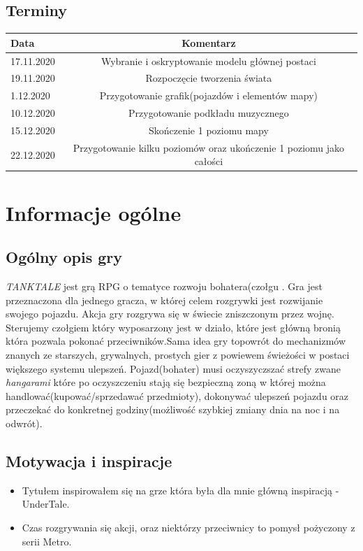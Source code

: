 \documentclass{article}
\begin{document}
   \subsection{Terminy}
\begin{tabular}{|l|c|}
	\hline
	Data  & Komentarz\\
	\hline
	17.11.2020  & Wybranie i oskryptowanie modelu głównej postaci\\
	\hline
	19.11.2020  & Rozpoczęcie tworzenia świata\\
	\hline
	1.12.2020  & Przygotowanie grafik(pojazdów i elementów mapy)\\
	\hline
	10.12.2020  & Przygotowanie podkładu muzycznego\\
	\hline
	15.12.2020  & Skończenie 1 poziomu mapy\\
		\hline
	22.12.2020  & Przygotowanie kilku poziomów oraz ukończenie 1 poziomu jako całości\\

	\hline
\end{tabular}

\newpage

\section{Informacje ogólne}
    \subsection{Ogólny opis gry}
    \emph{TANKTALE} jest grą RPG o tematyce rozwoju bohatera(czołgu . Gra jest przeznaczona dla jednego gracza, w której celem rozgrywki jest rozwijanie swojego pojazdu. Akcja gry rozgrywa się w świecie zniszczonym przez wojnę. Sterujemy czołgiem który wyposarzony jest w działo, które jest główną bronią która pozwala pokonać przeciwników.Sama  idea  gry  topowrót do mechanizmów znanych ze starszych, grywalnych, prostych gier z powiewem świeżości w postaci większego systemu ulepszeń. Pojazd(bohater) musi oczyszyczszać strefy zwane \emph{hangarami} które po oczyszczeniu stają się bezpieczną zoną w której można handlować(kupować/sprzedawać przedmioty), dokonywać ulepszeń pojazdu oraz przeczekać do konkretnej godziny(możliwość szybkiej zmiany dnia na noc i na odwrót). 
    
    \subsection{Motywacja i inspiracje}
    \begin{itemize}
        \item Tytułem inspirowałem się na grze która była dla mnie główną inspiracją - UnderTale.
        \item Czas rozgrywania się akcji, oraz niektórzy przeciwnicy to pomysł pożyczony z serii Metro.
    \end{itemize}
\end{document}

